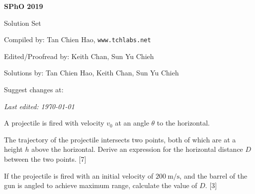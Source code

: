 \def\sphoyear{2019}
\setcounter{section}{0}
\setcounter{solcounter}{0}

\fancyhead[L]{\textbf{SPhO \sphoyear}} 


\begin{titlepage}
\centering

{\Huge\bfseries SPhO \sphoyear}

\vspace{1cm}

{\LARGE Solution Set}

\vspace{2cm}

{\Large Compiled by: Tan Chien Hao, \texttt{www.tchlabs.net}}

\vspace{2cm}

{\Large Edited/Proofread by: Keith Chan, Sun Yu Chieh}

\vspace{2cm}

{\Large Solutions by: Tan Chien Hao, Keith Chan, Sun Yu Chieh}

\vspace{2cm}

{\large Suggest changes at: \github}


\vfill

{\itshape Last edited: \today}
\end{titlepage}

\begin{problem}
    A projectile is fired with velocity $v_{0}$ at an angle $\theta$ to the horizontal.
    \begin{subproblem}
    The trajectory of the projectile intersects two points, both of which are at a height $h$ above the horizontal. Derive an expression for the horizontal distance $D$ between the two points.
    \hfill{[7]}\end{subproblem}
    \begin{subproblem}
    If the projectile is fired with an initial velocity of $\qty{200}{\m\per\s}$, and the barrel of the gun is angled to achieve maximum range, calculate the value of $D$.
    \hfill{[3]}\end{subproblem}
\end{problem}

